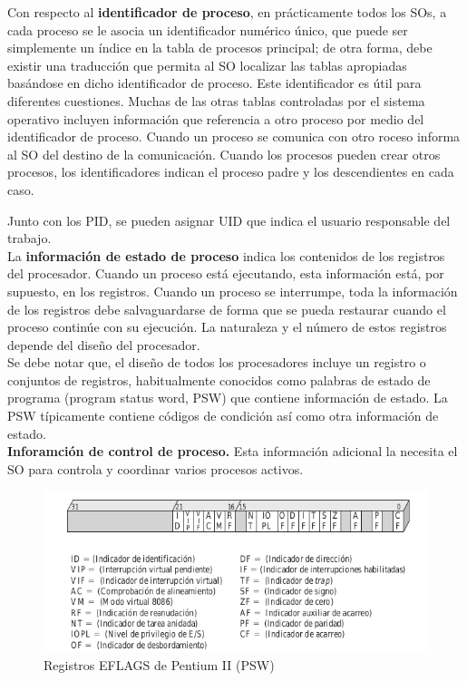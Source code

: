 \documentclass{article}
\begin{document}
				Con respecto al \textbf{identificador de proceso}, en prácticamente todos los SOs, a cada proceso se le asocia un identificador numérico único, que puede ser simplemente un índice en la tabla de procesos principal; de otra forma, debe existir una traducción que permita al SO localizar las tablas apropiadas basándose en dicho identificador de proceso. Este identificador es útil para diferentes cuestiones. Muchas de las otras tablas controladas por el sistema operativo incluyen información que referencia a otro proceso por medio del identificador de proceso. Cuando un proceso se comunica con otro roceso informa al SO del destino de la comunicación. Cuando los procesos pueden crear otros procesos, los identificadores indican el proceso padre y los descendientes en cada caso.
				
				Junto con los PID, se pueden asignar UID que indica el usuario responsable del trabajo. \\
				
				La \textbf{información de estado de proceso} indica los contenidos de los registros del procesador.
Cuando un proceso está ejecutando, esta información está, por supuesto, en los registros. Cuando un proceso se interrumpe, toda la información de los registros debe salvaguardarse de forma que se pueda restaurar cuando el proceso continúe con su ejecución. La naturaleza y el número de estos registros depende del diseño del procesador. \\

				Se debe notar que, el diseño de todos los procesadores incluye un registro o conjuntos de registros, habitualmente conocidos como palabras de estado de programa (program status word, PSW) que contiene información de estado. La PSW típicamente contiene códigos de condición así como otra información de estado. \\
				
				\textbf{Inforamción de control de proceso.} Esta información adicional la necesita el SO para controla y coordinar varios procesos activos. \\
				
				\begin{figure}
				\caption{Registros EFLAGS de Pentium II (PSW)}
				\label{figura2.12:PSW_PENTIUM}
				\centering
				\includegraphics[width=1\textwidth, scale=1]{tema_2_figura12.png}
				\end{figure}
				
\end{document}
